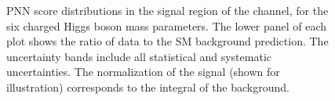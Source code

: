 \begin{figure}
			  \caption{\label{fig:taujets_SR_PNNscores_body} \gls{PNN} score distributions in the
			signal region of the \taujets channel, for the six charged Higgs boson mass parameters.
			The lower panel of each plot shows the ratio of data to the \acrshort{SM} background prediction. The uncertainty bands include all statistical and systematic uncertainties. 
			The normalization of the signal (shown for illustration) corresponds to the integral of the background.}
		\end{figure}

